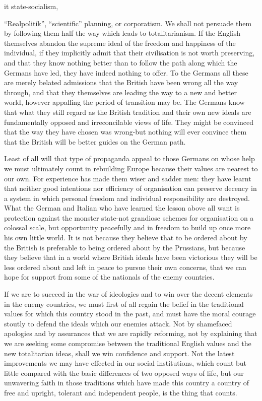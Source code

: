 \documentclass[11pt,openany]{book}
\begin{document}
it state-socialism,

``Realpolitik'', ``scientific'' planning, or corporatism. We shall not persuade them by following them half the way which leads to totalitarianism. If the English themselves abandon the supreme ideal of the freedom and happiness of the individual, if they implicitly admit that their civilisation is not worth preserving, and that they know nothing better than to follow the path along which the Germans have led, they have indeed nothing to offer. To the Germans all these are merely belated admissions that the British have been wrong all the way through, and that they themselves are leading the way to a new and better world, however appalling the period of transition may be. The Germans know that what they still regard as the British tradition and their own new ideals are fundamentally opposed and irreconcilable views of life. They might be convinced that the way they have chosen was wrong-but nothing will ever convince them that the British will be better guides on the German path.

Least of all will that type of propaganda appeal to those Germans on whose help we must ultimately count in rebuilding Europe because their values are nearest to our own. For experience has made them wiser and sadder men: they have learnt that neither good intentions nor efficiency of organisation can preserve decency in a system in which personal freedom and individual responsibility are destroyed. What the German and Italian who have learned the lesson above all want is protection against the monster state-not grandiose schemes for organisation on a colossal scale, but opportunity peacefully and in freedom to build up once more his own little world. It is not because they believe that to be ordered about by the British is preferable to being ordered about by the Prussians, but because they believe that in a world where British ideals have been victorious they will be less ordered about and left in peace to pursue their own concerns, that we can hope for support from some of the nationals of the enemy countries.

If we are to succeed in the war of ideologies and to win over the decent elements in the enemy countries, we must first of all regain the belief in the traditional values for which this country stood in the past, and must have the moral courage stoutly to defend the ideals which our enemies attack. Not by shamefaced apologies and by assurances that we are rapidly reforming, not by explaining that we are seeking some compromise between the traditional English values and the new totalitarian ideas, shall we win confidence and support. Not the latest improvements we may have effected in our social institutions, which count but little compared with the basic differences of two opposed ways of life, but our unwavering faith in those traditions which have made this country a country of free and upright, tolerant and independent people, is the thing that counts.
\end{document}
